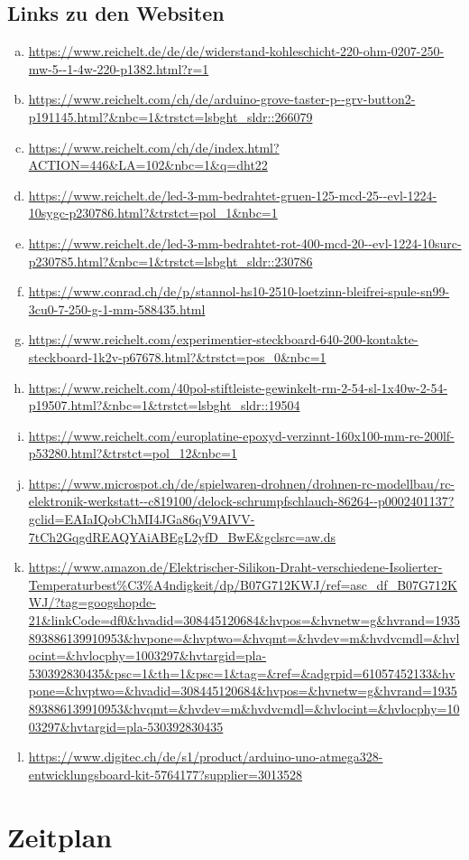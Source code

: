 \documentclass{paper}
\begin{document}
\subsection*{Links zu den Websiten}
\begin{enumerate}[(a)]
\item \url{https://www.reichelt.de/de/de/widerstand-kohleschicht-220-ohm-0207-250-mw-5--1-4w-220-p1382.html?r=1}
\item \url{https://www.reichelt.com/ch/de/arduino-grove-taster-p--grv-button2-p191145.html?&nbc=1&trstct=lsbght_sldr::266079}
\item \url{https://www.reichelt.com/ch/de/index.html?ACTION=446&LA=102&nbc=1&q=dht22}
\item \url{https://www.reichelt.de/led-3-mm-bedrahtet-gruen-125-mcd-25--evl-1224-10sygc-p230786.html?&trstct=pol_1&nbc=1}
\item \url{https://www.reichelt.de/led-3-mm-bedrahtet-rot-400-mcd-20--evl-1224-10surc-p230785.html?&nbc=1&trstct=lsbght_sldr::230786}
\item \url{https://www.conrad.ch/de/p/stannol-hs10-2510-loetzinn-bleifrei-spule-sn99-3cu0-7-250-g-1-mm-588435.html}
\item \url{https://www.reichelt.com/experimentier-steckboard-640-200-kontakte-steckboard-1k2v-p67678.html?&trstct=pos_0&nbc=1}
\item \url{https://www.reichelt.com/40pol-stiftleiste-gewinkelt-rm-2-54-sl-1x40w-2-54-p19507.html?&nbc=1&trstct=lsbght_sldr::19504}
\item \url{https://www.reichelt.com/europlatine-epoxyd-verzinnt-160x100-mm-re-200lf-p53280.html?&trstct=pol_12&nbc=1}
\item \url{https://www.microspot.ch/de/spielwaren-drohnen/drohnen-rc-modellbau/rc-elektronik-werkstatt--c819100/delock-schrumpfschlauch-86264--p0002401137?gclid=EAIaIQobChMI4JGa86qV9AIVV-7tCh2GqgdREAQYAiABEgL2yfD_BwE&gclsrc=aw.ds}
\item \url{https://www.amazon.de/Elektrischer-Silikon-Draht-verschiedene-Isolierter-Temperaturbest%C3%A4ndigkeit/dp/B07G712KWJ/ref=asc_df_B07G712KWJ/?tag=googshopde-21&linkCode=df0&hvadid=308445120684&hvpos=&hvnetw=g&hvrand=1935893886139910953&hvpone=&hvptwo=&hvqmt=&hvdev=m&hvdvcmdl=&hvlocint=&hvlocphy=1003297&hvtargid=pla-530392830435&psc=1&th=1&psc=1&tag=&ref=&adgrpid=61057452133&hvpone=&hvptwo=&hvadid=308445120684&hvpos=&hvnetw=g&hvrand=1935893886139910953&hvqmt=&hvdev=m&hvdvcmdl=&hvlocint=&hvlocphy=1003297&hvtargid=pla-530392830435}
\item \url{https://www.digitec.ch/de/s1/product/arduino-uno-atmega328-entwicklungsboard-kit-5764177?supplier=3013528}
\end{enumerate}
\section*{Zeitplan}
\inc
\end{document}

